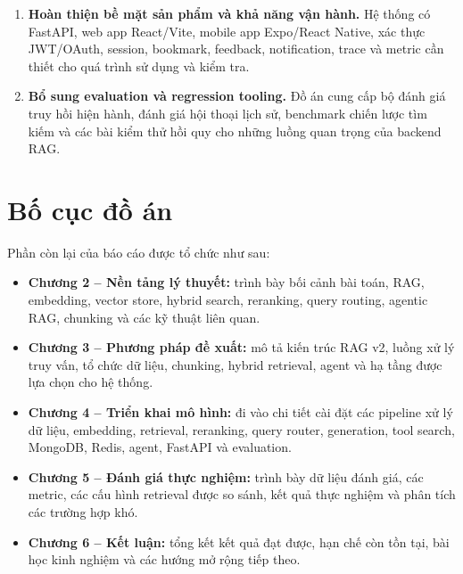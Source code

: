 \documentclass[../DoAn.tex]{subfiles}
\begin{document}
\begin{enumerate}
    \item \textbf{Hoàn thiện bề mặt sản phẩm và khả năng vận hành.}
    Hệ thống có FastAPI, web app React/Vite, mobile app Expo/React Native, xác
    thực JWT/OAuth, session, bookmark, feedback, notification, trace và metric
    cần thiết cho quá trình sử dụng và kiểm tra.

    \item \textbf{Bổ sung evaluation và regression tooling.}
    Đồ án cung cấp bộ đánh giá truy hồi hiện hành, đánh giá hội thoại lịch sử,
    benchmark chiến lược tìm kiếm và các bài kiểm thử hồi quy cho những luồng
    quan trọng của backend RAG.
\end{enumerate}

\section{Bố cục đồ án}
\label{sec:bocuc}

Phần còn lại của báo cáo được tổ chức như sau:

\begin{itemize}
    \item \textbf{Chương 2 -- Nền tảng lý thuyết:} trình bày bối cảnh bài toán,
    RAG, embedding, vector store, hybrid search, reranking, query routing,
    agentic RAG, chunking và các kỹ thuật liên quan.

    \item \textbf{Chương 3 -- Phương pháp đề xuất:} mô tả kiến trúc RAG v2, luồng
    xử lý truy vấn, tổ chức dữ liệu, chunking, hybrid retrieval, agent và hạ tầng
    được lựa chọn cho hệ thống.

    \item \textbf{Chương 4 -- Triển khai mô hình:} đi vào chi tiết cài đặt các
    pipeline xử lý dữ liệu, embedding, retrieval, reranking, query router,
    generation, tool search, MongoDB, Redis, agent, FastAPI và evaluation.

    \item \textbf{Chương 5 -- Đánh giá thực nghiệm:} trình bày dữ liệu đánh giá,
    các metric, các cấu hình retrieval được so sánh, kết quả thực nghiệm và phân
    tích các trường hợp khó.

    \item \textbf{Chương 6 -- Kết luận:} tổng kết kết quả đạt được, hạn chế còn
    tồn tại, bài học kinh nghiệm và các hướng mở rộng tiếp theo.
\end{itemize}
\end{document}
